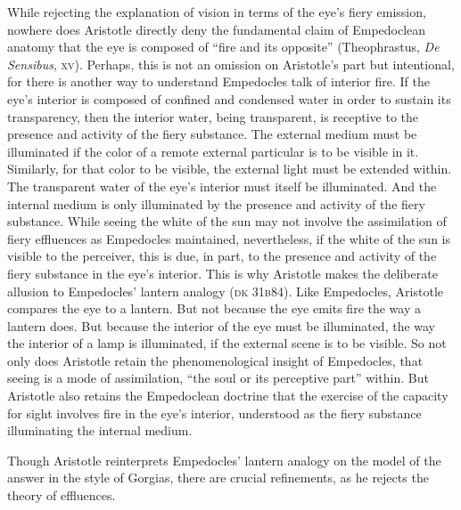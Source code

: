 While rejecting the explanation of vision in terms of the eye's fiery emission, nowhere does Aristotle directly deny the fundamental claim of Empedoclean a\-nat\-o\-my that the eye is composed of ``fire and its opposite'' (Theophrastus, \emph{De Sensibus}, \textsc{xv}). Perhaps, this is not an omission on Aristotle's part but intentional, for there is another way to understand Empedocles talk of interior fire. If the eye's interior is composed of confined and condensed water in order to sustain its transparency, then the interior water, being transparent, is receptive to the presence and activity of the fiery substance. The external medium must be illuminated if the color of a remote external particular is to be visible in it. Similarly, for that color to be visible, the external light must be extended within. The transparent water of the eye's interior must itself be illuminated. And the internal medium is only illuminated by the presence and activity of the fiery substance. While seeing the white of the sun may not involve the assimilation of fiery effluences as Empedocles maintained, nevertheless, if the white of the sun is visible to the perceiver, this is due, in part, to the presence and activity of the fiery substance in the eye's interior. This is why Aristotle makes the deliberate allusion to Empedocles' lantern analogy (\textsc{dk} 31\textsc{b}84). Like Empedocles, Aristotle compares the eye to a lantern. But not because the eye emits fire the way a lantern does. But because the interior of the eye must be illuminated, the way the interior of a lamp is illuminated, if the external scene is to be visible. So not only does Aristotle retain the phenomenological insight of Empedocles, that seeing is a mode of assimilation, ``the soul or its perceptive part'' within. But Aristotle also retains the Empedoclean doctrine that the exercise of the capacity for sight involves fire in the eye's interior, understood as the fiery substance illuminating the internal medium. 

Though Aristotle reinterprets Empedocles' lantern analogy on the model of the answer in the style of Gorgias, there are crucial refinements, as he rejects the theory of effluences. 

